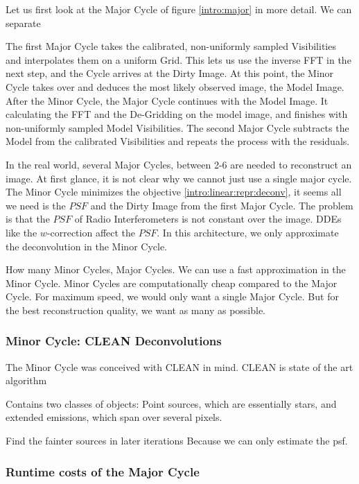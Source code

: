Let us first look at the Major Cycle of figure \ref{intro:major} in more detail. We can separate


The first Major Cycle takes the calibrated, non-uniformly sampled Visibilities and interpolates them on a uniform Grid. This lets us use the inverse FFT in the next step, and the Cycle arrives at the Dirty Image. At this point, the Minor Cycle takes over and deduces the most likely observed image, the Model Image. After the Minor Cycle, the Major Cycle continues with the Model Image. It calculating the FFT and the De-Gridding on the model image, and finishes with non-uniformly sampled Model Visibilities. The second Major Cycle subtracts the Model from the calibrated Visibilities and repeats the process with the residuals.

In the real world, several Major Cycles, between 2-6 are needed to reconstruct an image.
At first glance, it is not clear why we cannot just use a single major cycle. The Minor Cycle minimizes the objective \eqref{intro:linear:repr:deconv}, it seems all we need is the $PSF$ and the Dirty Image from the first Major Cycle. The problem is that the $PSF$ of Radio Interferometers is not constant over the image. DDEs like the $w$-correction affect the $PSF$. In this architecture, we only approximate the deconvolution in the Minor Cycle. 

How many Minor Cycles, Major Cycles. We can use a fast approximation in the Minor Cycle. Minor Cycles are computationally cheap compared to the Major Cycle. For maximum speed, we would only want a single Major Cycle. But for the best reconstruction quality, we want as many as possible.

\subsubsection{Minor Cycle: CLEAN Deconvolutions}

The Minor Cycle was conceived with CLEAN in mind.
CLEAN is state of the art algorithm

Contains two classes of objects: Point sources, which are essentially stars, and extended emissions, which span over several pixels.


Find the fainter sources in later iterations
Because we can only estimate the psf.

\subsubsection{Runtime costs of the Major Cycle}

